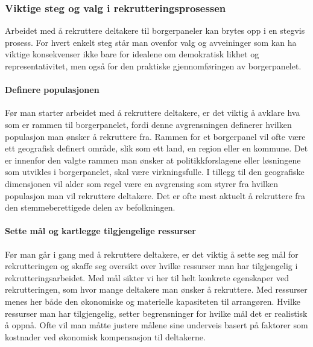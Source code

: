 \documentclass[
  12pt,
  a4paper, 12pt]{article}
\begin{document}
\hypertarget{viktige-steg-og-valg-i-rekrutteringsprosessen}{%
\subsubsection{Viktige steg og valg i rekrutteringsprosessen}\label{viktige-steg-og-valg-i-rekrutteringsprosessen}}

Arbeidet med å rekruttere deltakere til borgerpaneler kan brytes opp i en stegvis prosess. For hvert enkelt steg står man ovenfor valg og avveininger som kan ha viktige konsekvenser ikke bare for idealene om demokratisk likhet og representativitet, men også for den praktiske gjennomføringen av borgerpanelet.

\hypertarget{definere-populasjonen}{%
\paragraph{Definere populasjonen}\label{definere-populasjonen}}

Før man starter arbeidet med å rekruttere deltakere, er det viktig å avklare hva som er rammen til borgerpanelet, fordi denne avgrensningen definerer hvilken populasjon man ønsker å rekruttere fra. Rammen for et borgerpanel vil ofte være ett geografisk definert område, slik som ett land, en region eller en kommune. Det er innenfor den valgte rammen man ønsker at politikkforslagene eller løsningene som utvikles i borgerpanelet, skal være virkningsfulle. I tillegg til den geografiske dimensjonen vil alder som regel være en avgrensing som styrer fra hvilken populasjon man vil rekruttere deltakere. Det er ofte mest aktuelt å rekruttere fra den stemmeberettigede delen av befolkningen.

\hypertarget{sette-muxe5l-og-kartlegge-tilgjengelige-ressurser}{%
\paragraph{Sette mål og kartlegge tilgjengelige ressurser}\label{sette-muxe5l-og-kartlegge-tilgjengelige-ressurser}}

Før man går i gang med å rekruttere deltakere, er det viktig å sette seg mål for rekrutteringen og skaffe seg oversikt over hvilke ressurser man har tilgjengelig i rekrutteringsarbeidet. Med mål sikter vi her til helt konkrete egenskaper ved rekrutteringen, som hvor mange deltakere man ønsker å rekruttere. Med ressurser menes her både den økonomiske og materielle kapasiteten til arrangøren. Hvilke ressurser man har tilgjengelig, setter begrensninger for hvilke mål det er realistisk å oppnå. Ofte vil man måtte justere målene sine underveis basert på faktorer som kostnader ved økonomisk kompensasjon til deltakerne.
\end{document}
